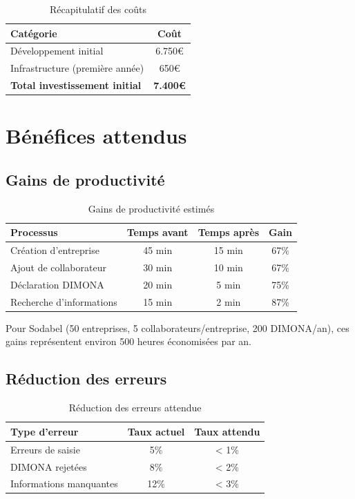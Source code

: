 \documentclass[12pt,a4paper]{report}
\begin{document}
\begin{table}[h]
\centering
\begin{tabular}{|l|c|}
\hline
\textbf{Catégorie} & \textbf{Coût} \\
\hline
Développement initial & 6.750€ \\
Infrastructure (première année) & 650€ \\
\hline
\textbf{Total investissement initial} & \textbf{7.400€} \\
\hline
\end{tabular}
\caption{Récapitulatif des coûts}
\end{table}

\section{Bénéfices attendus}

\subsection{Gains de productivité}

\begin{table}[h]
\centering
\begin{tabular}{|l|c|c|c|}
\hline
\textbf{Processus} & \textbf{Temps avant} & \textbf{Temps après} & \textbf{Gain} \\
\hline
Création d'entreprise & 45 min & 15 min & 67\% \\
Ajout de collaborateur & 30 min & 10 min & 67\% \\
Déclaration DIMONA & 20 min & 5 min & 75\% \\
Recherche d'informations & 15 min & 2 min & 87\% \\
\hline
\end{tabular}
\caption{Gains de productivité estimés}
\end{table}

Pour Sodabel (50 entreprises, 5 collaborateurs/entreprise, 200 DIMONA/an), ces gains représentent environ 500 heures économisées par an.

\subsection{Réduction des erreurs}

\begin{table}[h]
\centering
\begin{tabular}{|l|c|c|}
\hline
\textbf{Type d'erreur} & \textbf{Taux actuel} & \textbf{Taux attendu} \\
\hline
Erreurs de saisie & 5\% & < 1\% \\
DIMONA rejetées & 8\% & < 2\% \\
Informations manquantes & 12\% & < 3\% \\
\hline
\end{tabular}
\caption{Réduction des erreurs attendue}
\end{table}
\end{document}
